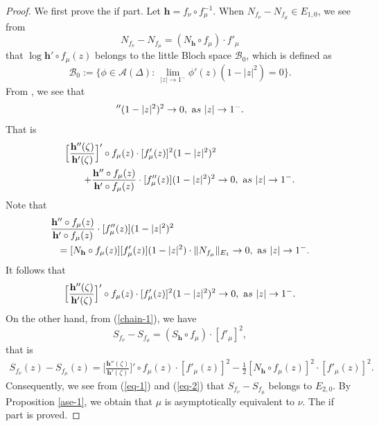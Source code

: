 \documentclass[11pt]{amsart}
\theoremstyle{remark}
\theoremstyle{claim}
\theoremstyle{definition}
\theoremstyle{problem}
\theoremstyle{conjecture}
\theoremstyle{question}
\numberwithin{equation}{section}
\begin{document}
\begin{proof}
We first prove the if part.  Let $\mathbf{h}=f_{\nu}\circ f_{\mu}^{-1}$.  When $N_{f_{\nu}}-N_{f_{\mu}}\in E_{1,0}$, we see from
\begin{equation}\label{eq-1}
N_{f_{\nu}}-N_{f_{\mu}}=(N_{\mathbf{h}}\circ f_{\mu})\cdot f'_{\mu}
\end{equation}
that $\log {\mathbf{h}}'\circ f_{\mu}(z)$ belongs to the little Bloch space $\mathcal{B}_0$, which is defined as
$${\mathcal{B}_0}:=\{\phi\in \mathcal{A}(\Delta):\, \lim\limits_{|z|\rightarrow 1^{-}}\phi'(z)(1-|z|^2)=0\}.$$
From \cite[Proposition 8]{Zh-1}, we see that
\begin{equation}
[\log {\mathbf{h}}'\circ f_{\mu}(z)]''(1-|z|^2)^2 \rightarrow 0,\,\, {\text as }\,\, |z| \rightarrow {1^{-}}. \nonumber
\end{equation}
That is
\begin{eqnarray}
\lefteqn{\Big[\frac{{\mathbf{h}}''(\zeta)}{{\mathbf{h}}'(\zeta)}\Big]'\circ f_{\mu}(z)\cdot [f'_{\mu}(z)]^2(1-|z|^2)^2}\nonumber \\
&&\quad+\frac{{\mathbf{h}}''\circ f_{\mu}(z)}{{\mathbf{h}}'\circ f_{\mu}(z)}\cdot [f''_{\mu}(z)](1-|z|^2)^2 \rightarrow 0,\,\, {\text as }\,\, |z| \rightarrow {1^{-}}. \nonumber
\end{eqnarray}
Note that
\begin{eqnarray}
\lefteqn{\frac{{\mathbf{h}}''\circ f_{\mu}(z)}{{\mathbf{h}}'\circ f_{\mu}(z)}\cdot [f''_{\mu}(z)](1-|z|^2)^2}\nonumber \\
&&=[N_{\mathbf{h}}\circ f_{\mu}(z)][f'_{\mu}(z)](1-|z|^2)\cdot \|N_{f_{\mu}}\|_{E_1}   \rightarrow 0,\,\, {\text as }\,\, |z| \rightarrow {1^{-}}. \nonumber
\end{eqnarray}
It follows that
\begin{eqnarray}\label{eq-2}
\Big[\frac{{\mathbf{h}}''(\zeta)}{{\mathbf{h}}'(\zeta)}\Big]'\circ f_{\mu}(z)\cdot [f'_{\mu}(z)]^2(1-|z|^2)^2  \rightarrow 0,\,\, {\text as }\,\, |z| \rightarrow {1^{-}}.
\end{eqnarray}
On the other hand, from (\ref{chain-1}), we have
\begin{equation}
S_{f_{\nu}}-S_{f_{\mu}}=(S_{\mathbf{h}}\circ f_{\mu})\cdot[f'_{\mu}]^2, \nonumber
\end{equation}
that is
\begin{eqnarray}
S_{f_{\nu}}(z)-S_{f_{\mu}}(z)=\Big[\frac{{\mathbf{h}}''(\zeta)}{{\mathbf{h}}'(\zeta)}\Big]'\circ f_{\mu}(z)\cdot[f'_{\mu}(z)]^2-\frac{1}{2}[N_{\mathbf{h}}\circ f_{\mu}(z)]^2\cdot[f'_{\mu}(z)]^2. \nonumber
\end{eqnarray}
Consequently, we see from (\ref{eq-1}) and (\ref{eq-2}) that $S_{f_{\nu}}-S_{f_{\mu}}$ belongs to $E_{2,0}$.  By Proposition \ref{ase-1}, we obtain that $\mu$ is  asymptotically equivalent to $\nu$. The if part is proved.


\end{proof}
\end{document}
